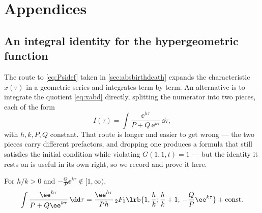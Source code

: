\appendix
\section*{Appendices}
\renewcommand{\thesubsection}{\Alph{subsection}}
\setcounter{subsection}{0}

\subsection{An integral identity for the hypergeometric function}
\label{app:hyp}

The route to \cref{eq:Psidef} taken in \cref{sec:absbirthdeath} expands the characteristic
$x(\tau)$ in a geometric series and integrates term by term. An alternative is to integrate
the quotient \cref{eq:xabd} directly, splitting the numerator into two pieces, each of the
form
\begin{equation}
\label{eq:Iform}
I(\tau) = \int\frac{\ee^{h\tau}}{P+Q\,\ee^{k\tau}}\,\dd\tau ,
\end{equation}
with $h,k,P,Q$ constant. That route is longer and easier to get wrong --- the two pieces
carry different prefactors, and dropping one produces a formula that still satisfies the
initial condition while violating $G(1,1,t)=1$ --- but the identity it rests on is useful in
its own right, so we record and prove it here.

\begin{proposition}
\label{prop:hypIden}
For $h/k>0$ and $-\tfrac{Q}{P}\ee^{k\tau}\notin[1,\infty)$,
\begin{equation}
\label{eq:hypIden}
\int\frac{\ee^{h\tau}}{P+Q\ee^{k\tau}}\,\dd\tau
= \frac{\ee^{h\tau}}{Ph}\,{}_2F_1\lrb{1,\frac{h}{k};\frac{h}{k}+1;\,-\frac{Q}{P}\ee^{k\tau}}
+ \text{const}.
\end{equation}
\end{proposition}

